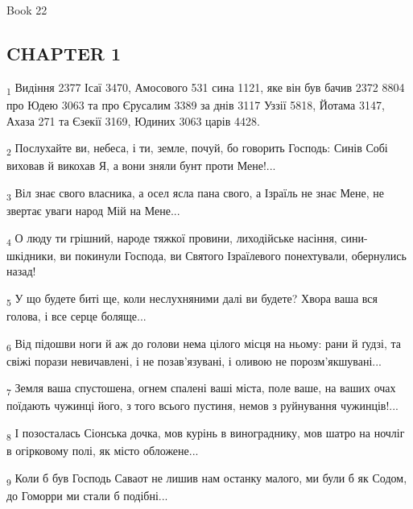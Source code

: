 Book 22
\subsection{CHAPTER 1}
\begin{tcolorbox}
\textsubscript{1} Видіння 2377 Ісаї 3470, Амосового 531 сина 1121, яке він був бачив 2372 8804 про Юдею 3063 та про Єрусалим 3389 за днів 3117 Уззії 5818, Йотама 3147, Ахаза 271 та Єзекії 3169, Юдиних 3063 царів 4428.
\end{tcolorbox}
\begin{tcolorbox}
\textsubscript{2} Послухайте ви, небеса, і ти, земле, почуй, бо говорить Господь: Синів Собі виховав й викохав Я, а вони зняли бунт проти Мене!...
\end{tcolorbox}
\begin{tcolorbox}
\textsubscript{3} Віл знає свого власника, а осел ясла пана свого, а Ізраїль не знає Мене, не звертає уваги народ Мій на Мене...
\end{tcolorbox}
\begin{tcolorbox}
\textsubscript{4} О люду ти грішний, народе тяжкої провини, лиходійське насіння, сини-шкідники, ви покинули Господа, ви Святого Ізраїлевого понехтували, обернулись назад!
\end{tcolorbox}
\begin{tcolorbox}
\textsubscript{5} У що будете биті ще, коли неслухняними далі ви будете? Хвора ваша вся голова, і все серце боляще...
\end{tcolorbox}
\begin{tcolorbox}
\textsubscript{6} Від підошви ноги й аж до голови нема цілого місця на ньому: рани й ґудзі, та свіжі порази невичавлені, і не позав'язувані, і оливою не порозм'якшувані...
\end{tcolorbox}
\begin{tcolorbox}
\textsubscript{7} Земля ваша спустошена, огнем спалені ваші міста, поле ваше, на ваших очах поїдають чужинці його, з того всього пустиня, немов з руйнування чужинців!...
\end{tcolorbox}
\begin{tcolorbox}
\textsubscript{8} І позосталась Сіонська дочка, мов курінь в винограднику, мов шатро на ночліг в огірковому полі, як місто обложене...
\end{tcolorbox}
\begin{tcolorbox}
\textsubscript{9} Коли б був Господь Саваот не лишив нам останку малого, ми були б як Содом, до Гоморри ми стали б подібні...
\end{tcolorbox}
